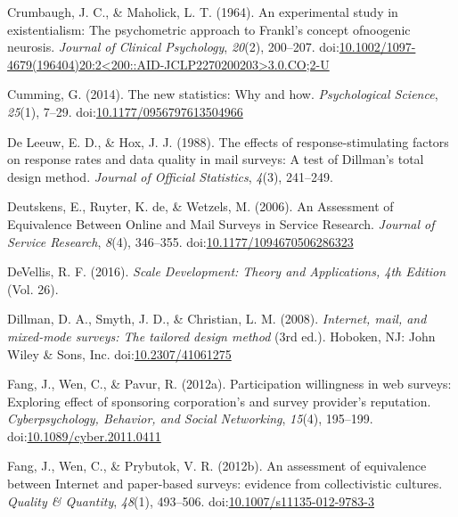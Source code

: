 \documentclass[english,man, mask]{apa6}
\theoremstyle{definition}
\theoremstyle{definition}
\theoremstyle{definition}
\theoremstyle{remark}
\begin{document}
\hypertarget{ref-Crumbaugh1964}{}
Crumbaugh, J. C., \& Maholick, L. T. (1964). An experimental study in
existentialism: The psychometric approach to Frankl's concept ofnoogenic
neurosis. \emph{Journal of Clinical Psychology}, \emph{20}(2), 200--207.
doi:\href{https://doi.org/10.1002/1097-4679(196404)20:2\%3C200::AID-JCLP2270200203\%3E3.0.CO;2-U}{10.1002/1097-4679(196404)20:2\textless{}200::AID-JCLP2270200203\textgreater{}3.0.CO;2-U}

\hypertarget{ref-Cumming2014}{}
Cumming, G. (2014). The new statistics: Why and how. \emph{Psychological
Science}, \emph{25}(1), 7--29.
doi:\href{https://doi.org/10.1177/0956797613504966}{10.1177/0956797613504966}

\hypertarget{ref-DeLeeuw1988}{}
De Leeuw, E. D., \& Hox, J. J. (1988). The effects of
response-stimulating factors on response rates and data quality in mail
surveys: A test of Dillman's total design method. \emph{Journal of
Official Statistics}, \emph{4}(3), 241--249.

\hypertarget{ref-Deutskens2006}{}
Deutskens, E., Ruyter, K. de, \& Wetzels, M. (2006). An Assessment of
Equivalence Between Online and Mail Surveys in Service Research.
\emph{Journal of Service Research}, \emph{8}(4), 346--355.
doi:\href{https://doi.org/10.1177/1094670506286323}{10.1177/1094670506286323}

\hypertarget{ref-DeVellis2016a}{}
DeVellis, R. F. (2016). \emph{Scale Development: Theory and
Applications, 4th Edition} (Vol. 26).

\hypertarget{ref-Dillman2008}{}
Dillman, D. A., Smyth, J. D., \& Christian, L. M. (2008).
\emph{Internet, mail, and mixed-mode surveys: The tailored design
method} (3rd ed.). Hoboken, NJ: John Wiley \& Sons, Inc.
doi:\href{https://doi.org/10.2307/41061275}{10.2307/41061275}

\hypertarget{ref-Fang2012a}{}
Fang, J., Wen, C., \& Pavur, R. (2012a). Participation willingness in
web surveys: Exploring effect of sponsoring corporation's and survey
provider's reputation. \emph{Cyberpsychology, Behavior, and Social
Networking}, \emph{15}(4), 195--199.
doi:\href{https://doi.org/10.1089/cyber.2011.0411}{10.1089/cyber.2011.0411}

\hypertarget{ref-Fang2012}{}
Fang, J., Wen, C., \& Prybutok, V. R. (2012b). An assessment of
equivalence between Internet and paper-based surveys: evidence from
collectivistic cultures. \emph{Quality \& Quantity}, \emph{48}(1),
493--506.
doi:\href{https://doi.org/10.1007/s11135-012-9783-3}{10.1007/s11135-012-9783-3}
\end{document}
